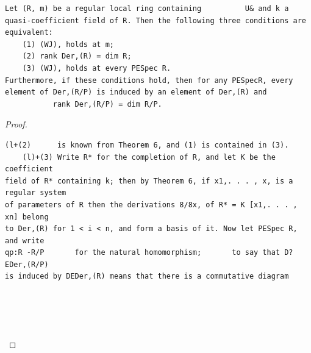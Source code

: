 \begin{theorem}\label{mcrt-auto-theorem-30-8}\uses{}
\begin{verbatim}
Let (R, m) be a regular local ring containing          U& and k a
quasi-coefficient field of R. Then the following three conditions are
equivalent:
    (1) (WJ), holds at m;
    (2) rank Der,(R) = dim R;
    (3) (WJ), holds at every PESpec R.
Furthermore, if these conditions hold, then for any PESpecR, every
element of Der,(R/P) is induced by an element of Der,(R) and
           rank Der,(R/P) = dim R/P.
\end{verbatim}
\end{theorem}
\begin{proof}
\begin{verbatim}
(l+(2)      is known from Theorem 6, and (1) is contained in (3).
    (l)+(3) Write R* for the completion of R, and let K be the coefficient
field of R* containing k; then by Theorem 6, if x1,. . . , x, is a regular system
of parameters of R then the derivations 8/8x, of R* = K [x1,. . . , xn] belong
to Der,(R) for 1 < i < n, and form a basis of it. Now let PESpec R, and write
qp:R -R/P       for the natural homomorphism;       to say that D?EDer,(R/P)
is induced by DEDer,(R) means that there is a commutative diagram





\end{verbatim}
\end{proof}
